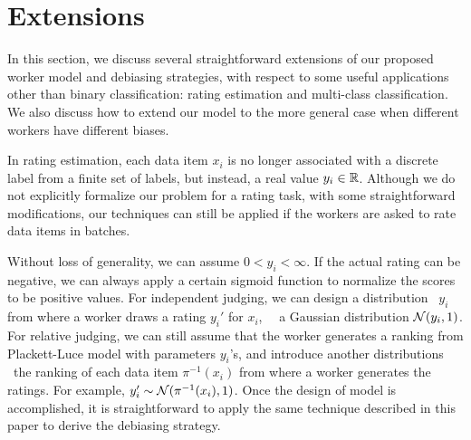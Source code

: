 
\section{Extensions}
\label{sec:ext}

In this section, we discuss several straightforward extensions of our proposed worker model and debiasing strategies, 
with respect to some useful applications other than binary classification: 
rating estimation and multi-class classification.  
We also discuss how to extend our model to the more general case when different workers have different biases.  

In rating estimation,
each data item $x_i$ is no longer associated with a discrete label
from a finite set of labels, 
but instead, a real value $y_i \in {\mathbb{R}}$.  
Although we do not explicitly formalize our problem for a rating task, 
with some straightforward modifications, 
our techniques can still be applied 
if the workers are asked to rate data items in batches.  

Without loss of generality, we can assume $0 < y_i < \infty$.  
If the actual rating can be negative, 
we can always apply a certain sigmoid function to normalize the scores to be positive values.  
For independent judging, we can design a distribution \wrt~$y_i$ from where a worker draws a rating $y_i'$ for $x_i$,
~\eg~a Gaussian distribution ${\mathcal{N}}(y_i, 1)$.  
For relative judging, we can still assume that the worker generates a ranking from Plackett-Luce model with parameters $y_i$'s, 
and introduce another distributions \wrt~the ranking of each data item $\pi^{-1}(x_i)$
from where a worker generates the ratings.  
For example, $y_i' \sim {\mathcal{N}}(\pi^{-1}(x_i), 1)$.  
Once the design of model is accomplished, 
it is straightforward to apply the same technique described in this paper 
to derive the debiasing strategy.


